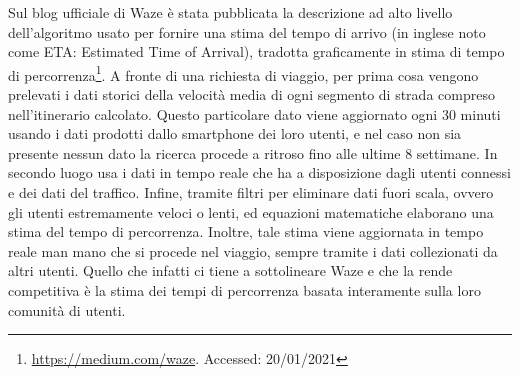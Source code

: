 Sul blog ufficiale di Waze è stata pubblicata la descrizione ad alto livello dell'algoritmo usato per fornire una stima del tempo di arrivo (in inglese noto come ETA: Estimated Time of Arrival), tradotta graficamente in stima di tempo di percorrenza\footnote{\url{https://medium.com/waze}. Accessed: 20/01/2021}. A fronte di una richiesta di viaggio, per prima cosa vengono prelevati i dati storici della velocità media di ogni segmento di strada compreso nell'itinerario calcolato. Questo particolare dato viene aggiornato ogni 30 minuti usando i dati prodotti dallo smartphone dei loro utenti, e nel caso non sia presente nessun dato la ricerca procede a ritroso fino alle ultime 8 settimane. In secondo luogo usa i dati in tempo reale che ha a disposizione dagli utenti connessi e dei dati del traffico. Infine, tramite filtri per eliminare dati fuori scala, ovvero gli utenti estremamente veloci o lenti, ed equazioni matematiche elaborano una stima del tempo di percorrenza. Inoltre, tale stima viene aggiornata in tempo reale man mano che si procede nel viaggio, sempre tramite i dati collezionati da altri utenti. Quello che infatti ci tiene a sottolineare Waze e che la rende competitiva è la stima dei tempi di percorrenza basata interamente sulla loro comunità di utenti.

























